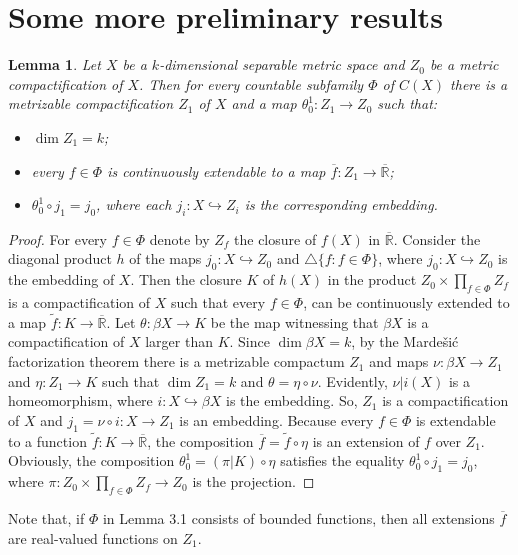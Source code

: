 \documentclass[12pt]{amsart}
\newtheorem{lem}[thm]{Lemma}
\begin{document}
\section{Some more preliminary results}
\begin{lem}
Let $X$ be a $k$-dimensional separable metric space and $Z_0$ be a metric compactification of $X$. Then for every countable subfamily $\Phi$ of 
$C(X)$ there is a metrizable compactification $Z_1$ of $X$ and a map $\theta^1_0: Z_1\to Z_0$ such that:
\begin{itemize}
\item $\dim Z_1=k$; 
\item every $f\in\Phi$ is continuously extendable to a map $\overline f:Z_1\to\overline{\mathbb R}$;
\item $\theta^1_0\circ j_1=j_0$, where each $j_i:X\hookrightarrow Z_i$ is the corresponding embedding.
\end{itemize}    
\end{lem}
\begin{proof}
For every $f\in\Phi$ denote by $Z_f$ the closure of $f(X)$ in $\overline{\mathbb R}$. Consider the diagonal product $h$ of the maps $j_0:X\hookrightarrow Z_0$ and $\triangle\{f:f\in\Phi\}$, where $j_0:X\hookrightarrow Z_0$ is the embedding of $X$. Then the closure $K$ of $h(X)$ in the product
$Z_0\times\prod_{f\in\Phi}Z_f$ is a compactification of $X$ such that every $f\in\Phi$, can be continuously extended to a map $\widetilde f:K\to\overline{\mathbb R}$. 
Let $\theta:\beta X\to K$ be the map witnessing that $\beta X$ is a compactification
of $X$ larger than $K$. Since $\dim\beta X=k$, by the Marde\v{s}i\'{c} factorization theorem \cite[Theorem 3.4.1]{en} there is a metrizable compactum $Z_1$ and maps $\nu:\beta X\to Z_1$ and $\eta:Z_1\to K$ such that $\dim Z_1=k$ and $\theta=\eta\circ\nu$. Evidently, $\nu|i(X)$ is a homeomorphism, where $i:X\hookrightarrow\beta X$ is the embedding. So, $Z_1$ is a compactification of $X$ and $j_1=\nu\circ i:X\to Z_1$ is an embedding. Because every $f\in\Phi$ is extendable to a function $\widetilde f:K\to\overline{\mathbb R}$, the composition $\overline f=\widetilde f\circ\eta$ is an extension of $f$ over $Z_1$. Obviously, the composition $\theta^1_0=(\pi|K)\circ\eta$ satisfies the equality $\theta^1_0\circ j_1=j_0$, where 
$\pi:Z_0\times\prod_{f\in\Phi}Z_f\to Z_0$ is the projection.
\end{proof}
Note that, if $\Phi$ in Lemma 3.1 consists of bounded functions, then all extensions $\overline f$ are real-valued functions on $Z_1$. 
\end{document}
